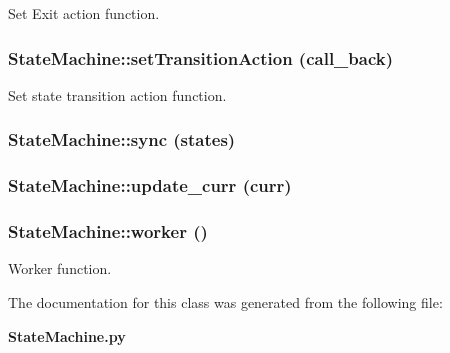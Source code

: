 Set Exit action function. 

\subsubsection{\setlength{\rightskip}{0pt plus 5cm}State\-Machine::set\-Transition\-Action (call\_\-back)}\label{classStateMachine_StateMachinea8}


Set state transition action function. 

\subsubsection{\setlength{\rightskip}{0pt plus 5cm}State\-Machine::sync (states)}\label{classStateMachine_StateMachinea16}


\subsubsection{\setlength{\rightskip}{0pt plus 5cm}State\-Machine::update\_\-curr (curr)}\label{classStateMachine_StateMachinea18}


\subsubsection{\setlength{\rightskip}{0pt plus 5cm}State\-Machine::worker ()}\label{classStateMachine_StateMachinea14}


Worker function. 



The documentation for this class was generated from the following file:\begin{CompactItemize}
\item 
{\bf State\-Machine.py}\end{CompactItemize}
